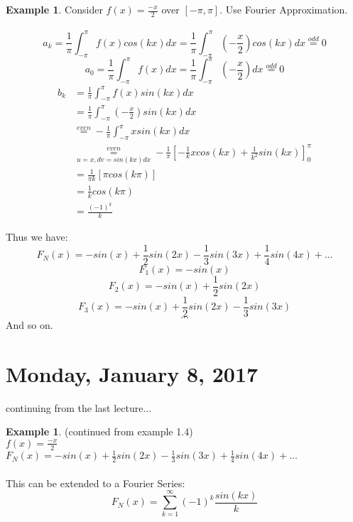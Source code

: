 \documentclass[12pt]{article}
\theoremstyle{plain}
\theoremstyle{definition}
\newtheorem{example}[theorem]{Example}
\begin{document}
\begin{example}
	Consider $f(x)=\frac{-x}{2}$ over $[-\pi, \pi]$. Use Fourier Approximation.\\
	\\
	$$a_k = \frac{1}{\pi} \int^{\pi}_{-\pi} f(x) cos(kx) dx = \frac{1}{\pi} \int^{\pi}_{-\pi} (-\frac{x}{2}) cos(kx) dx \overset{odd}{=} 0$$
	$$a_0 = \frac{1}{\pi} \int^{\pi}_{-\pi} f(x) dx = \frac{1}{\pi} \int^{\pi}_{-\pi} (-\frac{x}{2}) dx \overset{odd}{=} 0$$
	\begin{align*}
		b_k &= \frac{1}{\pi} \int^{\pi}_{-\pi} f(x) sin(kx) dx\\
		&= \frac{1}{\pi} \int^{\pi}_{-\pi} (-\frac{x}{2}) sin(kx) dx\\
		&\overset{even}{=} - \frac{1}{\pi} \int^{\pi}_{-\pi}  x sin(kx) dx\\
		&\underset{u=x, dv=sin(kx)dx}{\overset{even}{=}} - \frac{1}{\pi} [-\frac{1}{k} x cos(kx) + \frac{1}{k^2} sin(kx)]^\pi_0\\
		&= \frac{1}{\pi k} [\pi cos(k\pi)]\\
		&= \frac{1}{k} cos(k\pi)\\
		&= \frac{(-1)^k}{k}
	\end{align*}
	
	Thus we have:
	$$F_N (x) = -sin(x) + \frac{1}{2}sin(2x) - \frac{1}{3}sin(3x) + \frac{1}{4}sin(4x) + ...$$
	$$F_1 (x) = -sin(x)$$
	$$F_2 (x) = -sin(x) + \frac{1}{2}sin(2x)$$
	$$F_3 (x) = -sin(x) + \frac{1}{2}sin(2x) - \frac{1}{3}sin(3x)$$
	$$...$$
	And so on.

\end{example}

\newpage

\section{Monday, January 8, 2017}

continuing from the last lecture...

\begin{example}
    (continued from example 1.4)\\
    $f(x) = \frac{-x}{2}$\\
    $F_N (x) = -sin(x) + \frac{1}{2}sin(2x) - \frac{1}{3}sin(3x) + \frac{1}{4}sin(4x) + ...$\\
    \\
    This can be extended to a Fourier Series:
    $$F_N (x) = \sum^\infty_{k=1} (-1)^k \frac{sin(kx)}{k}$$
\end{example}
\end{document}
